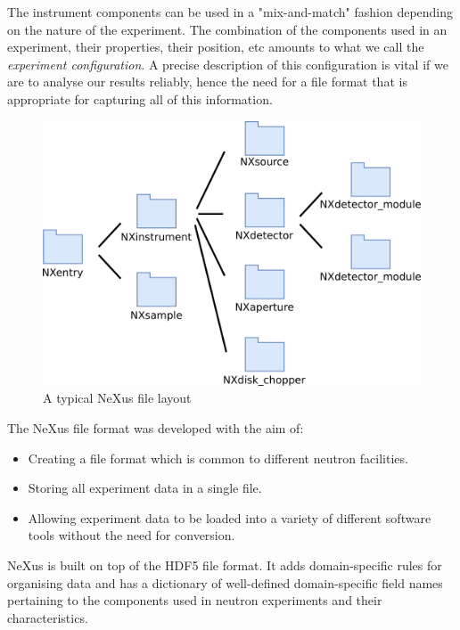 The instrument components can be used in a "mix-and-match" fashion depending on the nature of the experiment. The combination of the components used in an experiment, their properties, their position, etc amounts to what we call the \textit{experiment configuration}. A precise description of this configuration is vital if we are to analyse our results reliably, hence the need for a file format that is appropriate for capturing all of this information. 

\begin{figure}
\begin{center}
\includegraphics[width=0.8\linewidth]{instrument_arch.png}
\end{center}
\caption{A typical NeXus file layout}
\vspace{-50pt}
\end{figure}


The NeXus file format was developed with the aim of:
\begin{itemize}
\item Creating a file format which is common to different neutron facilities.
\item Storing all experiment data in a single file.
\item Allowing experiment data to be loaded into a variety of different software tools without the need for conversion.
\end{itemize}

\smallskip

NeXus is built on top of the HDF5 file format. It adds domain-specific rules for organising data and has a dictionary of well-defined domain-specific field names pertaining to the components used in neutron experiments and their characteristics.
